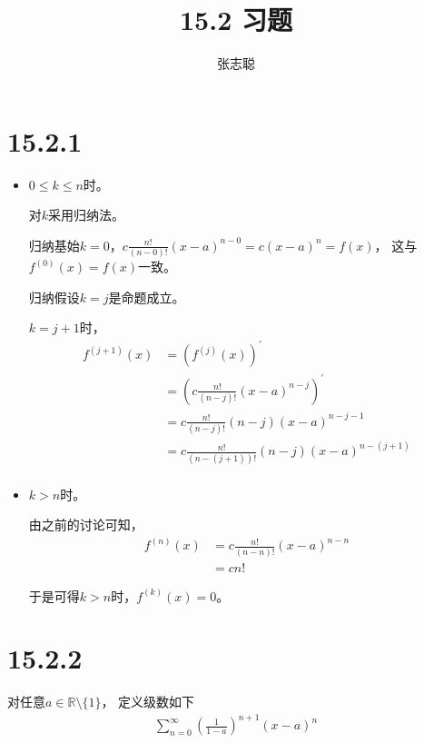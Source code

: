\documentclass{article}
\begin{document}
\title{15.2 习题}
\author{张志聪}
\maketitle

\section*{15.2.1}

\begin{itemize}
  \item $0 \leq k \leq n$时。

        对$k$采用归纳法。

        归纳基始$k = 0$，$c\frac{n!}{(n - 0)!}(x - a)^{n - 0} = c(x - a)^n = f(x)$，
        这与$f^{(0)}(x) = f(x)$一致。

        归纳假设$k = j$是命题成立。

        $k = j + 1$时，
        \begin{align*}
          f^{(j + 1)}(x)
           & = (f^{(j)}(x))^\prime                                    \\
           & = (c\frac{n!}{(n - j)!}(x - a)^{n - j})^\prime           \\
           & = c\frac{n!}{(n - j)!}(n - j)(x - a)^{n - j - 1}         \\
           & = c\frac{n!}{(n - (j + 1))!}(n - j)(x - a)^{n - (j + 1)} \\
        \end{align*}

  \item $k > n$时。

        由之前的讨论可知，
        \begin{align*}
          f^{(n)}(x)
           & = c\frac{n!}{(n - n)!}(x - a)^{n - n} \\
           & = cn!
        \end{align*}

        于是可得$k > n$时，$f^{(k)}(x) = 0$。

\end{itemize}

\section*{15.2.2}
对任意$a \in \mathbb{R} \setminus \{1\}$，
定义级数如下
\begin{align*}
  \sum\limits_{n = 0}^\infty (\frac{1}{1-a})^{n + 1} (x - a)^n
\end{align*}
\end{document}
